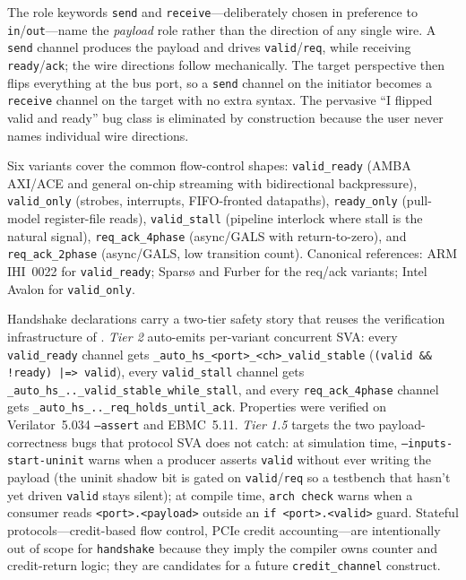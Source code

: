 \documentclass[11pt,twocolumn]{article}
\begin{document}
The role keywords \texttt{send} and \texttt{receive}---deliberately chosen in preference to \texttt{in}/\texttt{out}---name the \emph{payload} role rather than the direction of any single wire. A \texttt{send} channel produces the payload and drives \texttt{valid}/\texttt{req}, while receiving \texttt{ready}/\texttt{ack}; the wire directions follow mechanically. The target perspective then flips everything at the bus port, so a \texttt{send} channel on the initiator becomes a \texttt{receive} channel on the target with no extra syntax. The pervasive ``I flipped valid and ready'' bug class is eliminated by construction because the user never names individual wire directions.

Six variants cover the common flow-control shapes: \texttt{valid\_ready} (AMBA AXI/ACE and general on-chip streaming with bidirectional backpressure), \texttt{valid\_only} (strobes, interrupts, FIFO-fronted datapaths), \texttt{ready\_only} (pull-model register-file reads), \texttt{valid\_stall} (pipeline interlock where stall is the natural signal), \texttt{req\_ack\_4phase} (async/GALS with return-to-zero), and \texttt{req\_ack\_2phase} (async/GALS, low transition count). Canonical references: ARM IHI~0022 for \texttt{valid\_ready}; Sparsø and Furber for the req/ack variants; Intel Avalon for \texttt{valid\_only}.

Handshake declarations carry a two-tier safety story that reuses the verification infrastructure of . \emph{Tier 2} auto-emits per-variant concurrent SVA: every \texttt{valid\_ready} channel gets \texttt{\_auto\_hs\_<port>\_<ch>\_valid\_stable} (\texttt{(valid \&\& !ready) |=> valid}), every \texttt{valid\_stall} channel gets \texttt{\_auto\_hs\_..\_valid\_stable\_while\_stall}, and every \texttt{req\_ack\_4phase} channel gets \texttt{\_auto\_hs\_..\_req\_holds\_until\_ack}. Properties were verified on Verilator~5.034 \texttt{--assert} and EBMC~5.11. \emph{Tier 1.5} targets the two payload-correctness bugs that protocol SVA does not catch: at simulation time, \texttt{--inputs-start-uninit} warns when a producer asserts \texttt{valid} without ever writing the payload (the uninit shadow bit is gated on \texttt{valid}/\texttt{req} so a testbench that hasn't yet driven \texttt{valid} stays silent); at compile time, \texttt{arch check} warns when a consumer reads \texttt{<port>.<payload>} outside an \texttt{if <port>.<valid>} guard. Stateful protocols---credit-based flow control, PCIe credit accounting---are intentionally out of scope for \texttt{handshake} because they imply the compiler owns counter and credit-return logic; they are candidates for a future \texttt{credit\_channel} construct.
\end{document}
